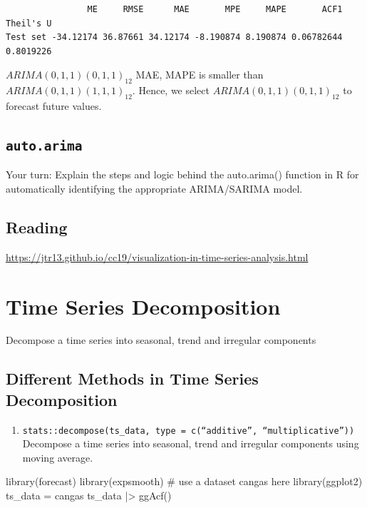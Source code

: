 \documentclass[
  11pt,
  a4paper,
]{report}
\newenvironment{Shaded}{\begin{snugshade}}{\end{snugshade}}
\newcommand{\CommentTok}[1]{\textcolor[rgb]{0.37,0.37,0.37}{#1}}
\newcommand{\FunctionTok}[1]{\textcolor[rgb]{0.28,0.35,0.67}{#1}}
\newcommand{\NormalTok}[1]{\textcolor[rgb]{0.00,0.23,0.31}{#1}}
\newcommand{\OtherTok}[1]{\textcolor[rgb]{0.00,0.23,0.31}{#1}}
\newcommand{\SpecialCharTok}[1]{\textcolor[rgb]{0.37,0.37,0.37}{#1}}
\providecommand{\tightlist}{%
  \setlength{\itemsep}{0pt}\setlength{\parskip}{0pt}}\usepackage{longtable,booktabs,array}
\begin{document}
\begin{verbatim}
                ME     RMSE      MAE       MPE     MAPE       ACF1 Theil's U
Test set -34.12174 36.87661 34.12174 -8.190874 8.190874 0.06782644 0.8019226
\end{verbatim}

\(ARIMA(0,1,1)(0,1,1)_{12}\) MAE, MAPE is smaller than
\(ARIMA(0,1,1)(1,1,1)_{12}\). Hence, we select
\(ARIMA(0,1,1)(0,1,1)_{12}\) to forecast future values.

\section{\texorpdfstring{\texttt{auto.arima}}{auto.arima}}\label{auto.arima}

Your turn: Explain the steps and logic behind the auto.arima() function
in R for automatically identifying the appropriate ARIMA/SARIMA model.

\section{Reading}\label{reading}

\url{https://jtr13.github.io/cc19/visualization-in-time-series-analysis.html}


\chapter{Time Series Decomposition}\label{sec-intro}

Decompose a time series into seasonal, trend and irregular components

\section{Different Methods in Time Series
Decomposition}\label{different-methods-in-time-series-decomposition}

\begin{enumerate}
\def\labelenumi{\arabic{enumi}.}
\tightlist
\item
  \texttt{stats::decompose(ts\_data,\ type\ =\ c(“additive”,\ “multiplicative”))}
  Decompose a time series into seasonal, trend and irregular components
  using moving average.
\end{enumerate}

\begin{Shaded}
\begin{Highlighting}[]
\FunctionTok{library}\NormalTok{(forecast)}
\FunctionTok{library}\NormalTok{(expsmooth) }\CommentTok{\# use a dataset cangas here}
\FunctionTok{library}\NormalTok{(ggplot2)}
\NormalTok{ts\_data }\OtherTok{=}\NormalTok{ cangas}
\NormalTok{ts\_data }\SpecialCharTok{|\textgreater{}} \FunctionTok{ggAcf}\NormalTok{()}
\end{Highlighting}
\end{Shaded}
\end{document}
